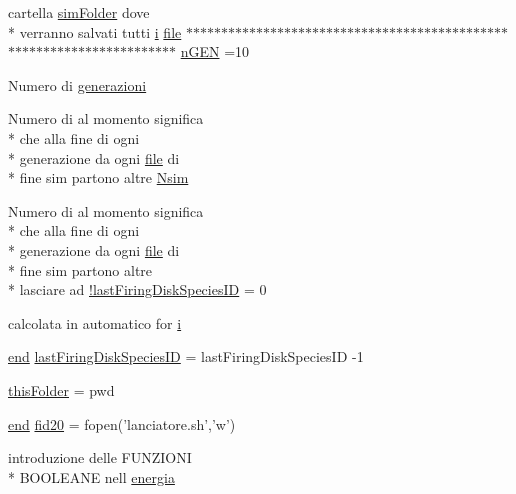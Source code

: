 \begin{DoxyCompactItemize}
cartella \hyperlink{a00032_aa671e3345005bd599e662bcaa115b18a}{sim\-Folder} dove \\*
verranno salvati tutti \hyperlink{a00113_ad3efca1ea6e3333daf30719ee0501862}{i} \hyperlink{a00110_a4e8353d6c62cf54bf4a1a8f63e56b8c3}{file} $\ast$$\ast$$\ast$$\ast$$\ast$$\ast$$\ast$$\ast$$\ast$$\ast$$\ast$$\ast$$\ast$$\ast$$\ast$$\ast$$\ast$$\ast$$\ast$$\ast$$\ast$$\ast$$\ast$$\ast$$\ast$$\ast$$\ast$$\ast$$\ast$$\ast$$\ast$$\ast$$\ast$$\ast$$\ast$$\ast$$\ast$$\ast$$\ast$$\ast$$\ast$$\ast$$\ast$$\ast$$\ast$$\ast$$\ast$$\ast$$\ast$$\ast$$\ast$$\ast$$\ast$$\ast$$\ast$$\ast$$\ast$$\ast$$\ast$$\ast$$\ast$$\ast$$\ast$$\ast$$\ast$$\ast$$\ast$$\ast$$\ast$$\ast$ \hyperlink{a00113_a4c8fe523edbe179c5d215da13f469f72}{n\-G\-E\-N} =10
\item 
Numero di \hyperlink{a00113_a5951b3462407a0e7e2e60534f76f5fec}{generazioni}
\item 
Numero di al momento significa \\*
che alla fine di ogni \\*
generazione da ogni \hyperlink{a00110_a4e8353d6c62cf54bf4a1a8f63e56b8c3}{file} di \\*
fine sim partono altre \hyperlink{a00113_af882a6050e97fe1c6cc2bb391ea57479}{Nsim}
\item 
Numero di al momento significa \\*
che alla fine di ogni \\*
generazione da ogni \hyperlink{a00110_a4e8353d6c62cf54bf4a1a8f63e56b8c3}{file} di \\*
fine sim partono altre \\*
lasciare ad \hyperlink{a00113_aafb51343927e7262fbd66ce291fdbb87}{!last\-Firing\-Disk\-Species\-I\-D} = 0
\item 
calcolata in automatico for \hyperlink{a00113_ad3efca1ea6e3333daf30719ee0501862}{i}
\item 
\hyperlink{a00025_afb358f48b1646c750fb9da6c6585be2b}{end} \hyperlink{a00113_ac9358e0c7555a21532187de31cdbd469}{last\-Firing\-Disk\-Species\-I\-D} = last\-Firing\-Disk\-Species\-I\-D -\/1
\item 
\hyperlink{a00113_a2d4125646b62462ce279d82913125ccf}{this\-Folder} = pwd
\item 
\hyperlink{a00025_afb358f48b1646c750fb9da6c6585be2b}{end} \hyperlink{a00113_aaad88534fbf3d065202db78a891374ca}{fid20} = fopen('lanciatore.\-sh','w')
\item 
introduzione delle F\-U\-N\-Z\-I\-O\-N\-I \\*
B\-O\-O\-L\-E\-A\-N\-E nell \hyperlink{a00113_a15a0e3f3007df072a07460518322b944}{energia}
$$
\end{DoxyCompactItemize}
